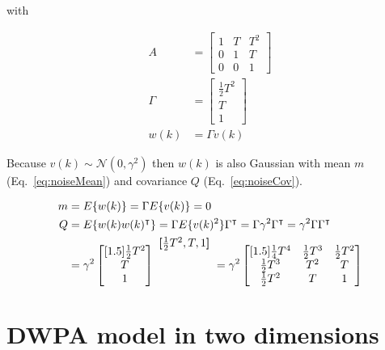 \documentclass[fleqn]{article}
\newenvironment{rowvector}
 {\bm{[}\begin{matrix}}
 {\end{matrix}\bm{]}}
\begin{document}
\noindent with 

\begin{align}
    A&=\begin{bmatrix}
          1 & T & T^2\\
          0 & 1 & T\\
          0 & 0 & 1
       \end{bmatrix}\nonumber\\
    \Gamma&=\begin{bmatrix}
               \frac{1}{2}T^2\\
               T\\
               1
            \end{bmatrix}\nonumber\\
    w(k)&=\Gamma v(k)\nonumber
\end{align}

Because $v(k)\sim\mathcal{N}(0,\gamma^2)$ then $w(k)$ is also Gaussian with
mean $m$ (Eq.~\ref{eq:noiseMean}) and covariance $Q$ (Eq.~\ref{eq:noiseCov}).

\begin{align}
    m&=E\{w(k)\}=\Gamma E\{v(k)\}=0\label{eq:noiseMean}\\
    Q&=E\{w(k)w(k)^\intercal\}=\Gamma
    E\{v(k)^2\}\Gamma^\intercal=\Gamma\gamma^2\Gamma^\intercal=\gamma^2\Gamma\Gamma^\intercal\nonumber\\
     &=\gamma^2\begin{bmatrix}[1.5]
                 \frac{1}{2}T^2\\
                 T\\
                 1
       \end{bmatrix}
     \raisebox{4.5ex}{
         $\begin{rowvector}\frac{1}{2}T^2, T, 1\end{rowvector}$
     }=\gamma^2\begin{bmatrix}[1.5]
                   \frac{1}{4}T^4&\frac{1}{2}T^3&\frac{1}{2}T^2\\
                   \frac{1}{2}T^3&T^2&T\\
                   \frac{1}{2}T^2&T&1
                \end{bmatrix}\label{eq:noiseCov}
\end{align}

\section{DWPA model in two dimensions}
\label{sec:dwpaModel2D}
\end{document}
